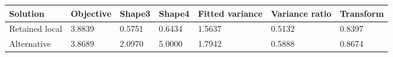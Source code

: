 \begin{tabular}{lllllll}
\toprule
Solution & Objective & Shape3 & Shape4 & Fitted variance & Variance ratio & Transform \\
\midrule
Retained local & 3.8839 & 0.5751 & 0.6434 & 1.5637 & 0.5132 & 0.8397 \\
Alternative & 3.8689 & 2.0970 & 5.0000 & 1.7942 & 0.5888 & 0.8674 \\
\bottomrule
\end{tabular}
